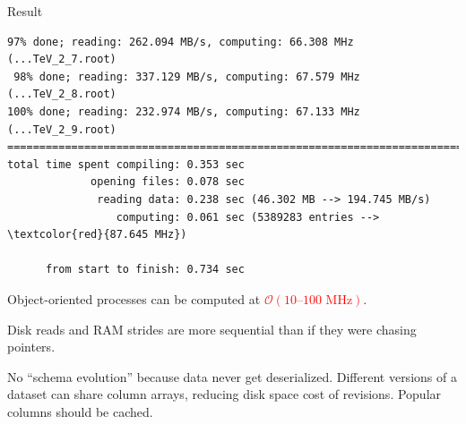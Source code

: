 \documentclass{beamer}
\begin{document}
\begin{frame}[fragile]{Result}
\vspace{0.5 cm}
\hspace{-0.75 cm}\begin{minipage}{\linewidth}\scriptsize
\begin{Verbatim}[commandchars=\\\{\}]
 97% done; reading: 262.094 MB/s, computing: 66.308 MHz (...TeV_2_7.root)
 98% done; reading: 337.129 MB/s, computing: 67.579 MHz (...TeV_2_8.root)
100% done; reading: 232.974 MB/s, computing: 67.133 MHz (...TeV_2_9.root)
========================================================================================
total time spent compiling: 0.353 sec
             opening files: 0.078 sec
              reading data: 0.238 sec (46.302 MB --> 194.745 MB/s)
                 computing: 0.061 sec (5389283 entries --> \textcolor{red}{87.645 MHz})

      from start to finish: 0.734 sec
\end{Verbatim}
\end{minipage}

\vspace{1 cm}
Object-oriented processes can be computed at \textcolor{red}{$\mathcal{O}(\mbox{10--100 MHz})$}.

\vspace{0.25 cm}
Disk reads and RAM strides are more sequential than if they were chasing pointers.

\vspace{0.25 cm}
No ``schema evolution'' because data never get deserialized. Different versions of a dataset can share column arrays, reducing disk space cost of revisions. Popular columns should be cached.
\end{frame}



\end{document}
